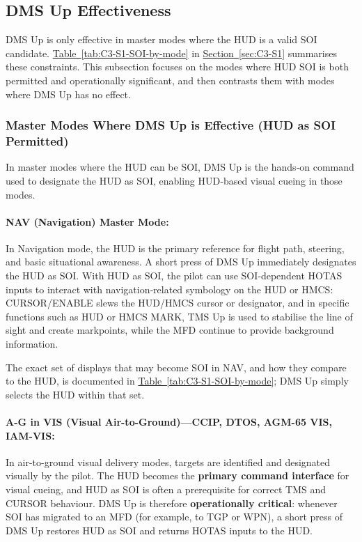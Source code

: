 \documentclass[11pt, a4paper, twoside]{report}
\newcommand{\secref}[1]{\hyperref[#1]{Section~\ref*{#1}}}
\newcommand{\tabref}[1]{\hyperref[#1]{Table~\ref*{#1}}}
\begin{document}
\subsection{DMS Up Effectiveness}
\label{sec:C3-S2-S1}

DMS Up is only effective in master modes where the HUD is a valid SOI candidate. \tabref{tab:C3-S1-SOI-by-mode} in \secref{sec:C3-S1} summarises these constraints. This subsection focuses on the modes where HUD SOI is both permitted and operationally significant, and then contrasts them with modes where DMS Up has no effect.

\subsubsection{Master Modes Where DMS Up is Effective (HUD as SOI Permitted)}
\label{sec:C3-S2-S1-S1}

In master modes where the HUD can be SOI, DMS Up is the hands‑on command used to designate the HUD as SOI, enabling HUD‑based visual cueing in those modes.

\paragraph*{NAV (Navigation) Master Mode:}
In Navigation mode, the HUD is the primary reference for flight path, steering, and basic situational awareness. A short press of DMS Up immediately designates the HUD as SOI. With HUD as SOI, the pilot can use SOI‑dependent HOTAS inputs to interact with navigation‑related symbology on the HUD or HMCS: CURSOR/ENABLE slews the HUD/HMCS cursor or designator, and in specific functions such as HUD or HMCS MARK, TMS Up is used to stabilise the line of sight and create markpoints, while the MFD continue to provide background information.

The exact set of displays that may become SOI in NAV, and how they compare to the HUD, is documented in \tabref{tab:C3-S1-SOI-by-mode}; DMS Up simply selects the HUD within that set.

\paragraph*{A-G in VIS (Visual Air-to-Ground)---CCIP, DTOS, AGM-65 VIS, IAM-VIS:}
In air-to-ground visual delivery modes, targets are identified and designated visually by the pilot. The HUD becomes the \textbf{primary command interface} for visual cueing, and HUD as SOI is often a prerequisite for correct TMS and CURSOR behaviour. DMS Up is therefore \textbf{operationally critical}: whenever SOI has migrated to an MFD (for example, to TGP or WPN), a short press of DMS Up restores HUD as SOI and returns HOTAS inputs to the HUD.
\end{document}
